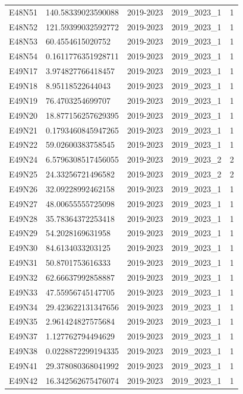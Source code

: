 \begin{landscape}
\begin{longtable}{lllll}
E48N51 & 140.58339023590088 & 2019-2023 & 2019\_2023\_1 & 1 \\
E48N52 & 121.59399032592772 & 2019-2023 & 2019\_2023\_1 & 1 \\
E48N53 & 60.4554615020752 & 2019-2023 & 2019\_2023\_1 & 1 \\
E48N54 & 0.1611776351928711 & 2019-2023 & 2019\_2023\_1 & 1 \\
E49N17 & 3.974827766418457 & 2019-2023 & 2019\_2023\_1 & 1 \\
E49N18 & 8.95118522644043 & 2019-2023 & 2019\_2023\_1 & 1 \\
E49N19 & 76.4703254699707 & 2019-2023 & 2019\_2023\_1 & 1 \\
E49N20 & 18.877156257629395 & 2019-2023 & 2019\_2023\_1 & 1 \\
E49N21 & 0.1793460845947265 & 2019-2023 & 2019\_2023\_1 & 1 \\
E49N22 & 59.02600383758545 & 2019-2023 & 2019\_2023\_1 & 1 \\
E49N24 & 6.5796308517456055 & 2019-2023 & 2019\_2023\_2 & 2 \\
E49N25 & 24.33256721496582 & 2019-2023 & 2019\_2023\_2 & 2 \\
E49N26 & 32.09228992462158 & 2019-2023 & 2019\_2023\_1 & 1 \\
E49N27 & 48.00655555725098 & 2019-2023 & 2019\_2023\_1 & 1 \\
E49N28 & 35.78364372253418 & 2019-2023 & 2019\_2023\_1 & 1 \\
E49N29 & 54.2028169631958 & 2019-2023 & 2019\_2023\_1 & 1 \\
E49N30 & 84.6134033203125 & 2019-2023 & 2019\_2023\_1 & 1 \\
E49N31 & 50.8701753616333 & 2019-2023 & 2019\_2023\_1 & 1 \\
E49N32 & 62.66637992858887 & 2019-2023 & 2019\_2023\_1 & 1 \\
E49N33 & 47.55956745147705 & 2019-2023 & 2019\_2023\_1 & 1 \\
E49N34 & 29.423622131347656 & 2019-2023 & 2019\_2023\_1 & 1 \\
E49N35 & 2.961424827575684 & 2019-2023 & 2019\_2023\_1 & 1 \\
E49N37 & 1.127762794494629 & 2019-2023 & 2019\_2023\_1 & 1 \\
E49N38 & 0.0228872299194335 & 2019-2023 & 2019\_2023\_1 & 1 \\
E49N41 & 29.378080368041992 & 2019-2023 & 2019\_2023\_1 & 1 \\
E49N42 & 16.342562675476074 & 2019-2023 & 2019\_2023\_1 & 1 \\

\end{longtable}
\end{landscape}
